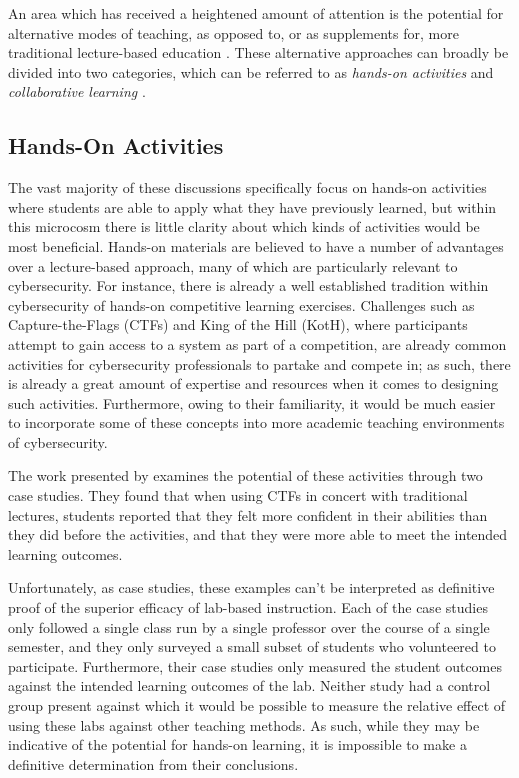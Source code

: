     An area which has received a heightened amount of attention is the potential for alternative modes of teaching, as opposed to, or as supplements for, more traditional lecture-based education \cite{Z-Zeng,N-Eliot,E-Gavas,C-Herr,K-Chung, C-Kussmaul,K-Leune,B-Payne,L-Thomas}. These alternative approaches can broadly be divided into two categories, which can be referred to as \emph{hands-on activities} and \emph{collaborative learning} \cite{P-Deshpande,C-Kussmaul,B-Payne}.

\subsection{Hands-On Activities}


    The vast majority of these discussions specifically focus on hands-on activities where students are able to apply what they have previously learned, but within this microcosm there is little clarity about which kinds of activities would be most beneficial. Hands-on materials are believed to have a number of advantages over a lecture-based approach, many of which are particularly relevant to cybersecurity. For instance, there is already a well established tradition within cybersecurity of hands-on competitive learning exercises. Challenges such as Capture-the-Flags (CTFs) and King of the Hill (KotH), where participants attempt to gain access to a system as part of a competition, are already common activities for cybersecurity professionals to partake and compete in; as such, there is already a great amount of expertise and resources when it comes to designing such activities. Furthermore, owing to their familiarity, it would be much easier to incorporate some of these concepts into more academic teaching environments of cybersecurity.

    The work presented by \textcite{K-Leune} examines the potential of these activities through two case studies. They found that when using CTFs in concert with traditional lectures, students reported that they felt more confident in their abilities than they did before the activities, and that they were more able to meet the intended learning outcomes. 

    Unfortunately, as case studies, these examples can't be interpreted as definitive proof of the superior efficacy of lab-based instruction. Each of the case studies only followed a single class run by a single professor over the course of a single semester, and they only surveyed a small subset of students who volunteered to participate. Furthermore, their case studies only measured the student outcomes against the intended learning outcomes of the lab. Neither study had a control group present against which it would be possible to measure the relative effect of using these labs against other teaching methods. As such, while they may be indicative of the potential for hands-on learning, it is impossible to make a definitive determination from their conclusions.

